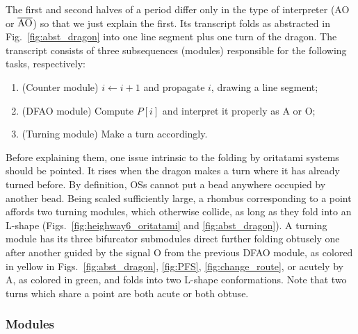The first and second halves of a period differ only in the type of interpreter (AO or $\overline{\rm AO}$) so that we just explain the first. 
Its transcript folds as abstracted in Fig.~\ref{fig:abst_dragon} into one line segment plus one turn of the dragon. 
The transcript consists of three subsequences (modules) responsible for the following tasks, respectively:  
\begin{enumerate}[itemsep=0pt]
\item (Counter module) $i \gets i + 1$ and propagate $i$, drawing a line segment;
\item (DFAO module) Compute $P[i]$ and interpret it properly as A or O;
\item (Turning module) Make a turn accordingly.
\end{enumerate}
Before explaining them, one issue intrinsic to the folding by oritatami systems should be pointed. 
It rises when the dragon makes a turn where it has already turned before. %
By definition, OSs cannot put a bead anywhere occupied by another bead. 
Being scaled sufficiently large, a rhombus corresponding to a point affords two turning modules, which otherwise collide, as long as they fold into an L-shape (Figs.~\ref{fig:heighway6_oritatami} and \ref{fig:abst_dragon}). 
A turning module has its three bifurcator submodules direct further folding obtusely one after another guided by the signal O from the previous DFAO module, as colored in yellow in Figs.~\ref{fig:abst_dragon}, \ref{fig:PFS}, \ref{fig:change_route}, or acutely by A, as colored in green, and folds into two L-shape conformations. 
Note that two turns which share a point are both acute or both obtuse. 

		\subsubsection{Modules}

